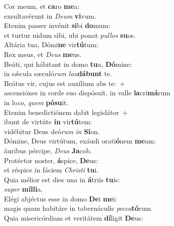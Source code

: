 \evenverse Cor meum, et \textbf{ca}ro \textbf{me}a:~\*\\
\evenverse exsultavérunt in \textit{De}\textit{um} \textbf{vi}vum.\\
\oddverse Etenim passer invénit \textbf{si}bi \textbf{do}mum:~\*\\
\oddverse et turtur nidum sibi, ubi ponat \textit{pul}\textit{los} \textbf{su}os.\\
\evenverse Altária tua, Dómi\textbf{ne} vir\textbf{tú}tum:~\*\\
\evenverse Rex meus, et \textit{De}\textit{us} \textbf{me}us.\\
\oddverse Beáti, qui hábitant in domo \textbf{tu}a, \textbf{Dó}mine:~\*\\
\oddverse in sǽcula sæculó\textit{rum} \textit{lau}\textbf{dá}\textbf{bunt} te.\\
\evenverse Beátus vir, cujus est auxílium abs te:~+\\
\evenverse  ascensiónes in corde suo dispósuit, in valle \textbf{la}cri\textbf{má}rum~\*\\
\evenverse in lo\textit{co}, \textit{quem} \textbf{pó}\textbf{su}it.\\
\oddverse Etenim benedictiónem dabit legislátor~+\\
\oddverse  ibunt de virtúte \textbf{in} vir\textbf{tú}tem:~\*\\
\oddverse vidébitur Deus deó\textit{rum} \textit{in} \textbf{Si}on.\\
\evenverse Dómine, Deus virtútum, exáudi orati\textbf{ó}nem \textbf{me}am:~\*\\
\evenverse áuribus pércipe, \textit{De}\textit{us} \textbf{Ja}cob.\\
\oddverse Protéctor noster, \textbf{á}spice, \textbf{De}us:~\*\\
\oddverse et réspice in fáciem \textit{Chri}\textit{sti} \textbf{tu}i.\\
\evenverse Quia mélior est dies una in \textbf{á}triis \textbf{tu}is:~\*\\
\evenverse \textit{su}\textit{per} \textbf{míl}\textbf{li}a.\\
\oddverse Elégi abjéctus esse in domo \textbf{De}i \textbf{me}i:~\*\\
\oddverse magis quam habitáre in tabernáculis \textit{pec}\textit{ca}\textbf{tó}rum.\\
\evenverse Quia misericórdiam et veritátem \textbf{dí}ligit \textbf{De}us:~\*\\
